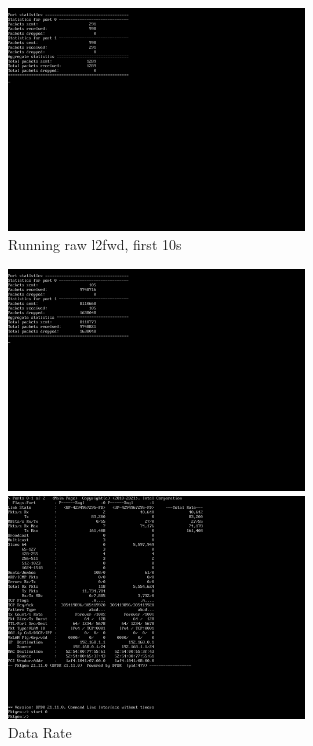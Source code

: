 \documentclass[12pt]{article}
\begin{document}
\begin{figure}[ht]
    \centering
    \includegraphics[width=0.7\textwidth]{figures/no-pktgen.png}
    \caption{Running raw l2fwd, first 10s}
    \label{fig:l2fwd-no-pktgen}
\end{figure}


\begin{figure}[ht]
    \centering
    \includegraphics[width=0.7\textwidth]{figures/l2fwding.png}
    
    \includegraphics[width=0.7\textwidth]{figures/pktgening.png}
    \caption{Data Rate}
     \label{fig:data}
\end{figure}
\end{document}
